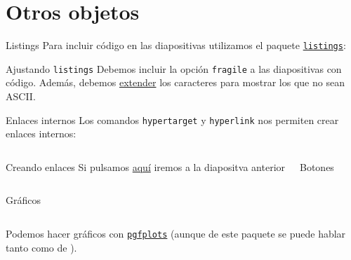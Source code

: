 \section{Otros objetos}

\begin{frame}{Listings}
  Para incluir código en las diapositivas utilizamos el paquete
  \href{https://www.ctan.org/tex-archive/macros/latex/contrib/listings}{\texttt{listings}}:
  \espacio
  \espacio
  \pause
  \begin{alertblock}{Ajustando \texttt{listings}}
    Debemos incluir la opción \texttt{fragile} a las diapositivas con código.
    Además, debemos \href{http://tex.stackexchange.com/questions/24528}{extender}
    los caracteres para mostrar los que no sean ASCII.
  \end{alertblock}
\end{frame}

\begin{frame}{Enlaces internos}
  Los comandos \texttt{hypertarget} y \texttt{hyperlink} nos permiten crear enlaces internos:
  \begin{columns}
      \begin{exampleblock}{Creando enlaces}
        Si pulsamos \hyperlink{ls}{aquí} iremos a la diapositva anterior
      \end{exampleblock}
      \begin{exampleblock}{Botones}

      \end{exampleblock}
  \end{columns}
\end{frame}

\begin{frame}{Gráficos}
\begin{columns}[c]

   Podemos hacer gráficos con \href{https://ctan.org/pkg/pgfplots}{\texttt{pgfplots}} (aunque de este paquete se puede hablar tanto como de \beamer).
  \end{columns}
\end{frame}

